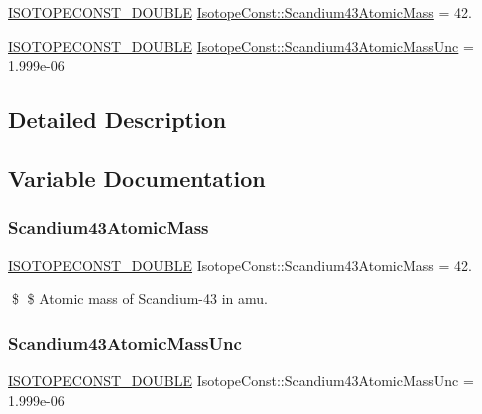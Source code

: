 \begin{DoxyCompactItemize}
\item 
\mbox{\hyperlink{group___isotope_const-_macros_ga8f45a7272ce02c0b4c65c44636ed719a}{I\+S\+O\+T\+O\+P\+E\+C\+O\+N\+S\+T\+\_\+\+D\+O\+U\+B\+LE}} \mbox{\hyperlink{group___isotope_const-_scandium-_sc43_ga4323437b73356e6f39a72f47372603e6}{Isotope\+Const\+::\+Scandium43\+Atomic\+Mass}} = 42.
\item 
\mbox{\hyperlink{group___isotope_const-_macros_ga8f45a7272ce02c0b4c65c44636ed719a}{I\+S\+O\+T\+O\+P\+E\+C\+O\+N\+S\+T\+\_\+\+D\+O\+U\+B\+LE}} \mbox{\hyperlink{group___isotope_const-_scandium-_sc43_gac49345d345b7cfcc220f95ebc520f926}{Isotope\+Const\+::\+Scandium43\+Atomic\+Mass\+Unc}} = 1.\+999e-\/06
\end{DoxyCompactItemize}


\subsection{Detailed Description}


\subsection{Variable Documentation}
\mbox{\label{group___isotope_const-_scandium-_sc43_ga4323437b73356e6f39a72f47372603e6}} 
\subsubsection{\texorpdfstring{Scandium43\+Atomic\+Mass}{Scandium43AtomicMass}}
{\footnotesize\ttfamily \mbox{\hyperlink{group___isotope_const-_macros_ga8f45a7272ce02c0b4c65c44636ed719a}{I\+S\+O\+T\+O\+P\+E\+C\+O\+N\+S\+T\+\_\+\+D\+O\+U\+B\+LE}} Isotope\+Const\+::\+Scandium43\+Atomic\+Mass = 42.}

\$ \$ Atomic mass of Scandium-\/43 in amu. \mbox{\label{group___isotope_const-_scandium-_sc43_gac49345d345b7cfcc220f95ebc520f926}} 
\subsubsection{\texorpdfstring{Scandium43\+Atomic\+Mass\+Unc}{Scandium43AtomicMassUnc}}
{\footnotesize\ttfamily \mbox{\hyperlink{group___isotope_const-_macros_ga8f45a7272ce02c0b4c65c44636ed719a}{I\+S\+O\+T\+O\+P\+E\+C\+O\+N\+S\+T\+\_\+\+D\+O\+U\+B\+LE}} Isotope\+Const\+::\+Scandium43\+Atomic\+Mass\+Unc = 1.\+999e-\/06}

